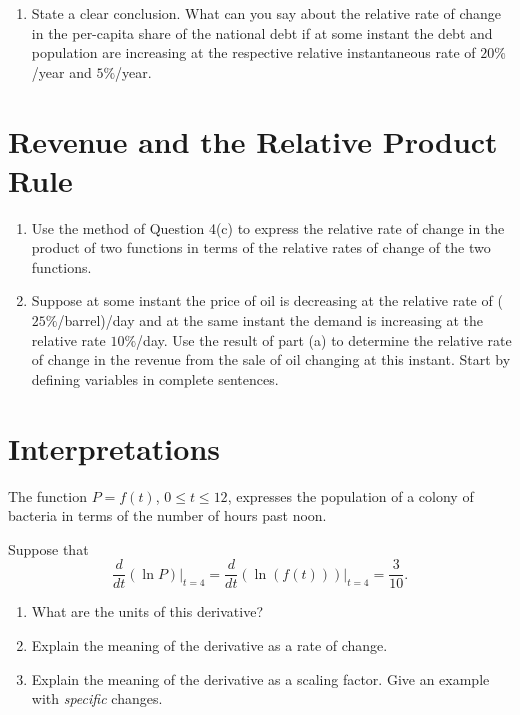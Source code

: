 \documentclass{ximera}
\begin{document}
\begin{question}
\begin{enumerate}
\item State a clear conclusion. What can you say about the relative rate of change in the per-capita share of the national debt if at some instant the debt and population are increasing at the respective relative instantaneous rate of $20\%$/year and $5\%$/year.

\begin{freeResponse}
\end{freeResponse}
\end{enumerate}
\end{question}


\section{Revenue and the Relative Product Rule}

\begin{question} \label{Qpferr3r3}
\begin{enumerate}
\item Use the method of Question 4(c) to express the relative rate of change in the product of two functions in terms of the relative rates of change of the two functions.

\item Suppose at some instant the price of oil is decreasing at the relative rate of ($25\%$/barrel)/day and at the same instant the demand is increasing at the relative rate $10\%$/day. Use the result of part (a) to determine the relative rate of change in the revenue from the sale of oil changing at this instant. Start by defining variables in complete sentences.

\end{enumerate}
\end{question}

\section{Interpretations}

\begin{question}  \label{Qghmnvngng}
The function $P=f(t)$, $0\leq t \leq 12$, expresses the population of a colony of bacteria in terms of the number of hours past noon.

Suppose that
\[
   \frac{d}{dt} \left(  \ln P \right)\Big|_{t=4} = \frac{d}{dt} \left(  \ln (f(t)) \right)\Big|_{t=4}  = \frac{3}{10} .
\]

\begin{enumerate}
\item What are the units of this derivative?

\item Explain the meaning of the derivative as a rate of change.

\item Explain the meaning of the derivative as a scaling factor. Give an example with \emph{specific} changes.
\end{enumerate}
\end{question}
\end{document}
